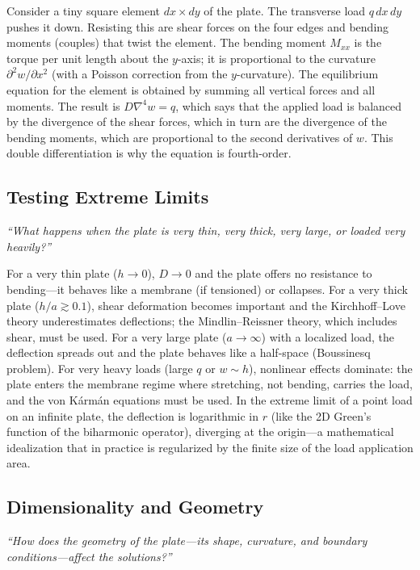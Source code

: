 Consider a tiny square element $dx \times dy$ of the plate. The transverse load $q\,dx\,dy$ pushes it down. Resisting this are shear forces on the four edges and bending moments (couples) that twist the element. The bending moment $M_{xx}$ is the torque per unit length about the $y$-axis; it is proportional to the curvature $\partial^{2}w/\partial x^{2}$ (with a Poisson correction from the $y$-curvature). The equilibrium equation for the element is obtained by summing all vertical forces and all moments. The result is $D\nabla^{4}w = q$, which says that the applied load is balanced by the divergence of the shear forces, which in turn are the divergence of the bending moments, which are proportional to the second derivatives of $w$. This double differentiation is why the equation is fourth-order.

\subsection*{Testing Extreme Limits}
\textit{``What happens when the plate is very thin, very thick, very large, or loaded very heavily?''}

For a very thin plate ($h \to 0$), $D \to 0$ and the plate offers no resistance to bending---it behaves like a membrane (if tensioned) or collapses. For a very thick plate ($h/a \gtrsim 0.1$), shear deformation becomes important and the Kirchhoff--Love theory underestimates deflections; the Mindlin--Reissner theory, which includes shear, must be used. For a very large plate ($a \to \infty$) with a localized load, the deflection spreads out and the plate behaves like a half-space (Boussinesq problem). For very heavy loads (large $q$ or $w \sim h$), nonlinear effects dominate: the plate enters the membrane regime where stretching, not bending, carries the load, and the von Kármán equations must be used. In the extreme limit of a point load on an infinite plate, the deflection is logarithmic in $r$ (like the 2D Green's function of the biharmonic operator), diverging at the origin---a mathematical idealization that in practice is regularized by the finite size of the load application area.

\subsection*{Dimensionality and Geometry}
\textit{``How does the geometry of the plate---its shape, curvature, and boundary conditions---affect the solutions?''}

